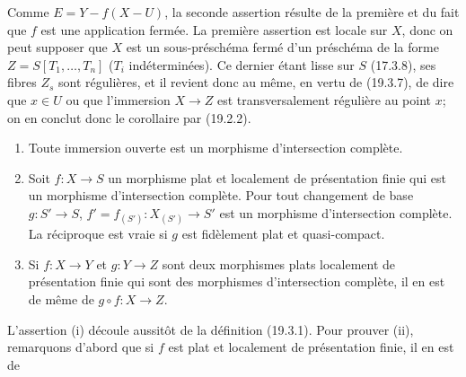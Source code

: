 Comme $E=Y-f(X-U)$, la seconde assertion résulte de la première et du fait que $f$ est une application fermée. La première assertion est locale sur $X$, donc on peut supposer que $X$ est un sous-préschéma fermé d'un préschéma de la forme $Z=S[T_1,\ldots,T_n]$ ($T_i$ indéterminées). Ce dernier étant lisse sur $S$ (17.3.8), ses fibres $Z_s$ sont régulières, et il revient donc au même, en vertu de (19.3.7), de dire que $x\in U$ ou que l'immersion $X\to Z$ est transversalement régulière au point $x$; on en conclut donc le corollaire par (19.2.2).

\begin{proposition}[19.3.9]
\label{IV.19.3.9}
\begin{enumerate}
  \item[(i)] Toute immersion ouverte est un morphisme d'intersection complète.
  \item[(ii)] Soit $f:X\to S$ un morphisme plat et localement de présentation finie qui est un morphisme d'intersection complète. Pour tout changement de base $g:S'\to S$, $f'=f_{(S')}:X_{(S')}\to S'$ est un morphisme d'intersection complète. La réciproque est vraie si $g$ est fidèlement plat et quasi-compact.
  \item[(iii)] Si $f:X\to Y$ et $g:Y\to Z$ sont deux morphismes plats localement de présentation finie qui sont des morphismes d'intersection complète, il en est de même de $g\circ f:X\to Z$.
\end{enumerate}
\end{proposition}

L'assertion (i) découle aussitôt de la définition (19.3.1). Pour prouver (ii), remarquons d'abord que si $f$ est plat et localement de présentation finie, il en est de

